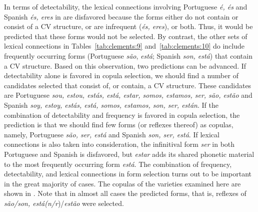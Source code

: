 \documentclass[output=paper,colorlinks,citecolor=brown]{langscibook}
\begin{document}
In terms of detectability, the lexical connections involving Portuguese \textit{é, és} and Spanish \textit{és, eres} in  are disfavored because the forms either do not contain or consist of a CV structure, or are infrequent (\textit{és, eres}), or both. Thus, it would be predicted that these forms would not be selected. By contrast, the other sets of lexical connections in Tables~\ref{tab:clements:9} and~\ref{tab:clements:10} do include frequently occurring forms (Portuguese \textit{são}, \textit{está}; Spanish \textit{son, está}) that contain a CV structure. Based on this observation, two predictions can be advanced. If detectability alone is favored in copula selection, we should find a number of candidates selected that consist of, or contain, a CV structure. These candidates are Portuguese \textit{sou, estou, estás, está, estar, somos, estamos, ser, são, estão} and Spanish \textit{soy, estoy, estás, está, somos, estamos, son, ser, están}. If the combination of detectability and frequency is favored in copula selection, the prediction is that we should find few forms (or reflexes thereof) as copulas, namely, Portuguese \textit{são, ser, está} and Spanish \textit{son, ser, está}. If lexical connections is also taken into consideration, the infinitival form \textit{ser} in both Portuguese and Spanish is disfavored, but \textit{estar} adds its shared phonetic material to the most frequently occurring form \textit{está}. The combination of frequency, detectability, and lexical connections in form selection turns out to be important in the great majority of cases. The copulas of the varieties examined here are shown in . Note that in almost all cases the predicted forms, that is, reflexes of \textit{são/son, está(n/r})/\textit{estão} were selected.
\end{document}
